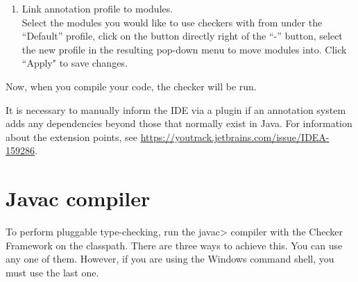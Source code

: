 \begin{enumerate}
\item
  Link annotation profile to modules.\\
  Select the modules you would like to use checkers with from under the ``Default'' profile,
  click on the button directly right of the ``-'' button,
  select the new profile in the resulting pop-down menu to move modules into. Click ``Apply" to save changes.

\end{enumerate}

Now, when you compile your code, the checker will be run.

It is necessary to manually inform the IDE via a plugin if an annotation
system adds any dependencies beyond those that normally exist in Java.
For information about the extension points, see
\url{https://youtrack.jetbrains.com/issue/IDEA-159286}.


\section{Javac compiler\label{javac-installation}}

To perform pluggable type-checking, run the \<javac> compiler with the
Checker Framework on the classpath.
There are three ways to achieve this.  You can use any
one of them.  However, if you are using the Windows command shell, you must
use the last one.


